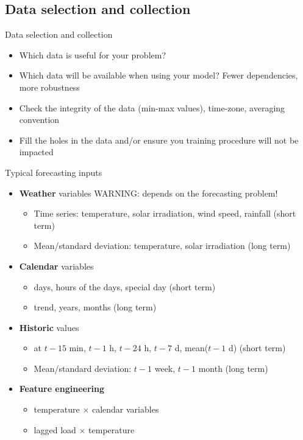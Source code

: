 \subsection{Data selection and collection}
\begin{frame}{Data selection and collection}
        \begin{itemize}
            \item Which data is useful for your problem?
            \item Which data will be available when using your model? Fewer dependencies, more robustness
            \item Check the integrity of the data (min-max values), time-zone, averaging convention
            \item Fill the holes in the data and/or ensure you training procedure will not be impacted 
        \end{itemize}
\end{frame}

\begin{frame}{Typical forecasting inputs}
    \begin{itemize}
    \item \textbf{Weather} variables \alert{WARNING: depends on the forecasting problem!}
        \begin{itemize}
            \item Time series: temperature, solar irradiation, wind speed, rainfall (short term)
            \item Mean/standard deviation: temperature, solar irradiation (long term)
        \end{itemize}
    \item \textbf{Calendar} variables
    \begin{itemize}
        \item days, hours of the days, special day  (short term)
        \item trend, years, months (long term)
    \end{itemize}
    \item \textbf{Historic} values
    \begin{itemize}
        \item at $t-15$ min, $t-1$ h, $t-24$ h, $t-7$ d, mean($t-1$ d) (short term)
        \item Mean/standard deviation: $t-1$ week, $t-1$ month (long term)
    \end{itemize}
    \item \textbf{Feature engineering}
    \begin{itemize}
        \item temperature $\times$ calendar variables
        \item lagged load $\times$ temperature
    \end{itemize}
    \end{itemize}
\end{frame}

